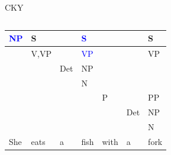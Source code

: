 \documentclass[
	hyperref={unicode},
	xcolor={svgnames, table},
	aspectratio=169,
	french,
]{beamer}
\begin{document}
\begin{frame}{CKY}
\begin{columns}
\begin{column}{0.65\textwidth}
{\begin{table}[]
\begin{tabular}{lllllll}
\hline
\multicolumn{1}{|l|}{\textcolor{blue}{NP}} & \multicolumn{1}{l|}{S}     & \multicolumn{1}{l|}{}    & \multicolumn{1}{l|}{\textcolor{blue}{S}}  & \multicolumn{1}{l|}{}  & \multicolumn{1}{l|}{}    & \multicolumn{1}{l|}{{\color[HTML]{FFFFFF} S}}  \\ \hline
\multicolumn{1}{l|}{}    & \multicolumn{1}{l|}{\small{V,VP}} & \multicolumn{1}{l|}{}    & \multicolumn{1}{l|}{\textcolor{blue}{VP}} & \multicolumn{1}{l|}{}  & \multicolumn{1}{l|}{}    & \multicolumn{1}{l|}{{\color[HTML]{FFFFFF} VP}} \\ \cline{2-7} 
												 & \multicolumn{1}{l|}{}      & \multicolumn{1}{l|}{Det} & \multicolumn{1}{l|}{NP} & \multicolumn{1}{l|}{}  & \multicolumn{1}{l|}{}    & \multicolumn{1}{l|}{}                          \\ \cline{3-7} 
												 &                            & \multicolumn{1}{l|}{}    & \multicolumn{1}{l|}{N}  & \multicolumn{1}{l|}{}  & \multicolumn{1}{l|}{}    & \multicolumn{1}{l|}{}                          \\ \cline{4-7} 
												 &                            &                          & \multicolumn{1}{l|}{}   & \multicolumn{1}{l|}{P} & \multicolumn{1}{l|}{}    & \multicolumn{1}{l|}{PP}                        \\ \cline{5-7} 
												 &                            &                          &                         & \multicolumn{1}{l|}{}  & \multicolumn{1}{l|}{Det} & \multicolumn{1}{l|}{NP}                        \\ \cline{6-7} 
												 &                            &                          &                         &                        & \multicolumn{1}{l|}{}    & \multicolumn{1}{l|}{N}                         \\ \cline{7-7} 
She                      & eats                       & a                        & fish                    & with                   & a                        & fork                                          
\end{tabular}
\end{table}
	}
\end{column}
\end{columns}
\end{frame}
\end{document}

